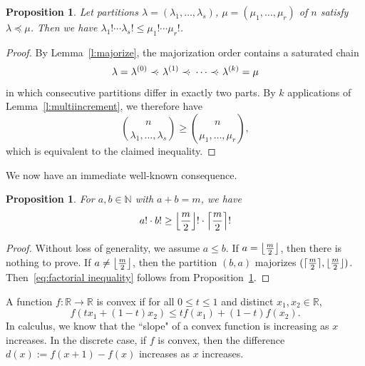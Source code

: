 \documentclass[12pt]{amsart}
\DeclarePairedDelimiter\ceil{\lceil}{\rceil}
\DeclarePairedDelimiter\floor{\lfloor}{\rfloor}
\newtheorem{prop}[thm]{Proposition}
\theoremstyle{definition}
\numberwithin{equation}{section}
\newcommand{\defeq}{:=}
\newcommand{\precdot}{\prec \negthickspace \negthinspace \cdot\ }
\begin{document}
\begin{prop}\label{p:majorfracineq}
    Let partitions $\lambda = (\lambda_1,\dotsc,\lambda_s)$, $\mu = (\mu_1,\dotsc, \mu_r)$ of $n$ satisfy $\lambda \preceq \mu$.
    Then we have $\lambda_1! \cdots \lambda_s! \leq \mu_1! \cdots \mu_r!$.
\end{prop}
\begin{proof}
    By Lemma~\ref{l:majorize}, the majorization order contains a saturated chain
    \begin{equation*}
        \lambda = \lambda^{(0)} \precdot \lambda^{(1)} \precdot \cdots \precdot \lambda^{(k)} = \mu
        \end{equation*}
        in which consecutive partitions differ in exactly two parts.
    By $k$ applications of Lemma~\ref{l:multiincrement}, we therefore have
    \begin{equation*}
        {n\choose \lambda_1,\dotsc,\lambda_s} \geq {n\choose \mu_1,\dotsc,\mu_r},
    \end{equation*}
    which is equivalent to the claimed inequality.
\end{proof}

We now have an immediate well-known consequence.

\begin{prop}\label{p:factorial inequality}
    For $a, b \in \mathbb N$ with
    $a+b=m$, we have
    \begin{equation}\label{eq:factorial inequality}
        a! \cdot b! \geq \floor*{\frac{m}{2}}! \cdot \ceil*{\frac{m}{2}}!
    \end{equation}
\end{prop}
\begin{proof}
    Without loss of generality, we assume $a\leq b$. If $a = \floor*{\frac{m}{2}}$, then there is nothing to prove. If $a \neq \floor*{\frac{m}{2}}$, then the partition $(b,a)$ majorizes $(\ceil{\tfrac{m}{2}},\floor{\tfrac{m}{2}})$. Then~\eqref{eq:factorial inequality} follows from Proposition~\ref{p:majorfracineq}.

\end{proof}

A function $f: \mathbb{R} \rightarrow \mathbb{R}$ is convex if for all $0\leq t \leq1$ and distinct $x_1,x_2 \in \mathbb{R}$,
\begin{equation}f(tx_1+(1-t)x_2) \leq tf(x_1) + (1-t)f(x_2).
\end{equation}
In calculus, we know that the ``slope" of a convex function is increasing as $x$ increases. In the discrete case, if $f$ is convex, then the difference $d(x) \defeq f(x+1) - f(x)$ increases as $x$ increases.
\end{document}
